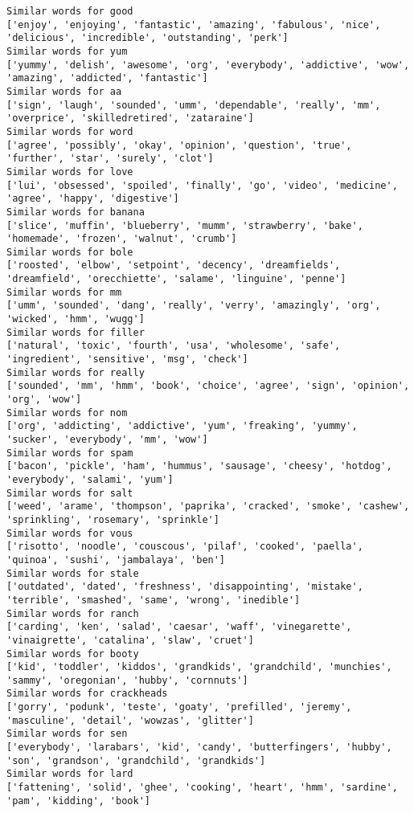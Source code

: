 \documentclass[11pt]{article}
\begin{document}
    \begin{Verbatim}[commandchars=\\\{\}]
Similar words for good
['enjoy', 'enjoying', 'fantastic', 'amazing', 'fabulous', 'nice', 'delicious', 'incredible', 'outstanding', 'perk']
Similar words for yum
['yummy', 'delish', 'awesome', 'org', 'everybody', 'addictive', 'wow', 'amazing', 'addicted', 'fantastic']
Similar words for aa
['sign', 'laugh', 'sounded', 'umm', 'dependable', 'really', 'mm', 'overprice', 'skilledretired', 'zataraine']
Similar words for word
['agree', 'possibly', 'okay', 'opinion', 'question', 'true', 'further', 'star', 'surely', 'clot']
Similar words for love
['lui', 'obsessed', 'spoiled', 'finally', 'go', 'video', 'medicine', 'agree', 'happy', 'digestive']
Similar words for banana
['slice', 'muffin', 'blueberry', 'mumm', 'strawberry', 'bake', 'homemade', 'frozen', 'walnut', 'crumb']
Similar words for bole
['roosted', 'elbow', 'setpoint', 'decency', 'dreamfields', 'dreamfield', 'orecchiette', 'salame', 'linguine', 'penne']
Similar words for mm
['umm', 'sounded', 'dang', 'really', 'verry', 'amazingly', 'org', 'wicked', 'hmm', 'wugg']
Similar words for filler
['natural', 'toxic', 'fourth', 'usa', 'wholesome', 'safe', 'ingredient', 'sensitive', 'msg', 'check']
Similar words for really
['sounded', 'mm', 'hmm', 'book', 'choice', 'agree', 'sign', 'opinion', 'org', 'wow']
Similar words for nom
['org', 'addicting', 'addictive', 'yum', 'freaking', 'yummy', 'sucker', 'everybody', 'mm', 'wow']
Similar words for spam
['bacon', 'pickle', 'ham', 'hummus', 'sausage', 'cheesy', 'hotdog', 'everybody', 'salami', 'yum']
Similar words for salt
['weed', 'arame', 'thompson', 'paprika', 'cracked', 'smoke', 'cashew', 'sprinkling', 'rosemary', 'sprinkle']
Similar words for vous
['risotto', 'noodle', 'couscous', 'pilaf', 'cooked', 'paella', 'quinoa', 'sushi', 'jambalaya', 'ben']
Similar words for stale
['outdated', 'dated', 'freshness', 'disappointing', 'mistake', 'terrible', 'smashed', 'same', 'wrong', 'inedible']
Similar words for ranch
['carding', 'ken', 'salad', 'caesar', 'waff', 'vinegarette', 'vinaigrette', 'catalina', 'slaw', 'cruet']
Similar words for booty
['kid', 'toddler', 'kiddos', 'grandkids', 'grandchild', 'munchies', 'sammy', 'oregonian', 'hubby', 'cornnuts']
Similar words for crackheads
['gorry', 'podunk', 'teste', 'goaty', 'prefilled', 'jeremy', 'masculine', 'detail', 'wowzas', 'glitter']
Similar words for sen
['everybody', 'larabars', 'kid', 'candy', 'butterfingers', 'hubby', 'son', 'grandson', 'grandchild', 'grandkids']
Similar words for lard
['fattening', 'solid', 'ghee', 'cooking', 'heart', 'hmm', 'sardine', 'pam', 'kidding', 'book']

\end{Verbatim}
\end{document}
